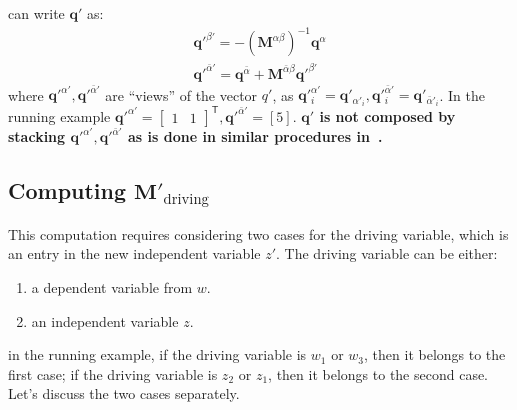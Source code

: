 \documentclass{article}
\providecommand{\tr}[1]{{#1}^{\ensuremath{\mathsf{T}}}} %
\providecommand{\vect}[1]{\bm#1}
\providecommand{\mat}[1]{\mathbf#1}
\newcommand{\1}{(\textos{1})\!}
\newcommand{\2}{(\textos{2})\!}
\newcommand{\3}{(\textos{3})\!}
\newcommand{\4}{(\textos{4})\!}
\newcommand{\5}{(\textos{5})\!}
\newcommand{\6}{(\textos{6})\!}
\newcommand{\7}{(\textos{7})\!}
\newcommand{\8}{(\textos{8})\!}
\begin{document}
can write $\vect{q}'$ as:
\begin{align}
	\vect{q}'^{\beta'} = -(\mat{M}^{\alpha\beta})^{-1}\vect{q}^{\alpha}
 \tag{2} \\ 
	\vect{q}'^{\bar{\alpha}'} = \vect{q}^{\bar{\alpha}} +
    \mat{M}^{\bar{\alpha}\beta}\vect{q}'^{\beta'}
 \tag{3} 
\end{align}
where $\vect{q}'^{\alpha'}, \vect{q}'^{\bar{\alpha}'}$ are ``views'' of the
vector $q'$, as $\vect{q}'^{\alpha'}_i = \vect{q}'_{\alpha'_i},
\vect{q}'^{\bar{\alpha}'}_i = \vect{q}'_{\bar{\alpha}'_i}$. In the running
example $\vect{q}'^{\alpha'} = \tr{\begin{bmatrix}1 & 1\end{bmatrix}},
\vect{q}'^{\bar{\alpha}'} = [5]$. \textbf{$\vect{q}'$ is not composed by
stacking $\vect{q}'^{\alpha'}, \vect{q}'^{\bar{\alpha}'}$ as is done in similar procedures in~\cite{Cottle:1992}.}



\subsection{Computing $\mat{M}'_{\textrm{driving}}$}
This computation requires considering two cases for the driving variable, which is an entry in the new independent variable $z'$. The driving variable can be either:
\begin{enumerate}
		\item a dependent variable from $w$.
		\item an independent variable $z$.
\end{enumerate}
in the running example, if the driving variable is $w_1$ or $w_3$, then it belongs to the first case; if the driving variable is $z_2$ or $z_1$, then it belongs to the second case. Let's discuss the two cases separately.
\end{document}

